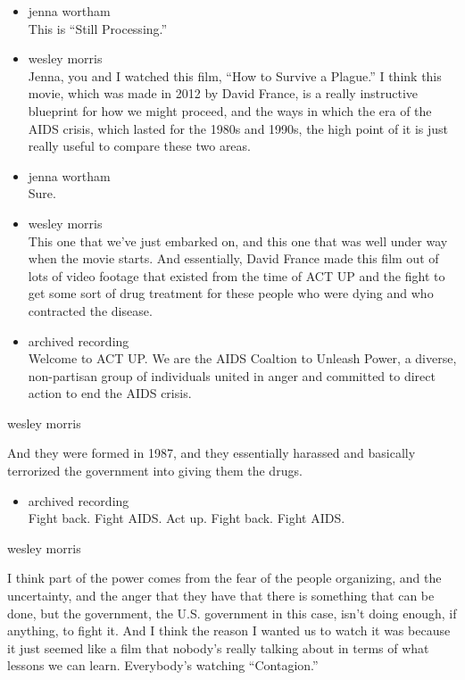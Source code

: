 \begin{itemize}
\item
  jenna wortham\\
  This is ``Still Processing.''
\item
  wesley morris\\
  Jenna, you and I watched this film, ``How to Survive a Plague.'' I
  think this movie, which was made in 2012 by David France, is a really
  instructive blueprint for how we might proceed, and the ways in which
  the era of the AIDS crisis, which lasted for the 1980s and 1990s, the
  high point of it is just really useful to compare these two areas.
\item
  jenna wortham\\
  Sure.
\item
  wesley morris\\
  This one that we've just embarked on, and this one that was well under
  way when the movie starts. And essentially, David France made this
  film out of lots of video footage that existed from the time of ACT UP
  and the fight to get some sort of drug treatment for these people who
  were dying and who contracted the disease.
\item
  archived recording\\
  Welcome to ACT UP. We are the AIDS Coaltion to Unleash Power, a
  diverse, non-partisan group of individuals united in anger and
  committed to direct action to end the AIDS crisis.
\end{itemize}

wesley morris

And they were formed in 1987, and they essentially harassed and
basically terrorized the government into giving them the drugs.

\begin{itemize}
\tightlist
\item
  archived recording\\
  Fight back. Fight AIDS. Act up. Fight back. Fight AIDS.
\end{itemize}

wesley morris

I think part of the power comes from the fear of the people organizing,
and the uncertainty, and the anger that they have that there is
something that can be done, but the government, the U.S. government in
this case, isn't doing enough, if anything, to fight it. And I think the
reason I wanted us to watch it was because it just seemed like a film
that nobody's really talking about in terms of what lessons we can
learn. Everybody's watching ``Contagion.''

